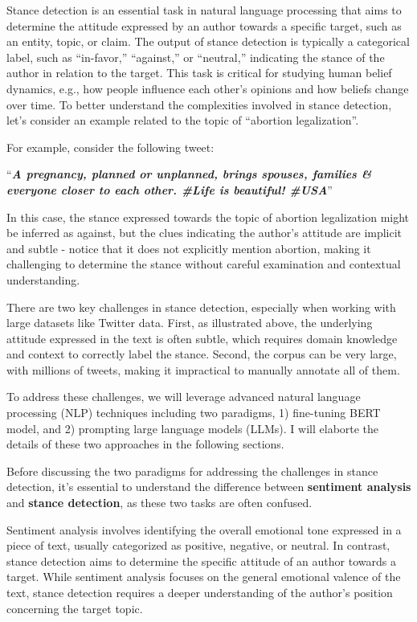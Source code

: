 \documentclass[11pt]{article}
\begin{document}
    Stance detection is an essential task in natural language processing
that aims to determine the attitude expressed by an author towards a
specific target, such as an entity, topic, or claim. The output of
stance detection is typically a categorical label, such as ``in-favor,''
``against,'' or ``neutral,'' indicating the stance of the author in
relation to the target. This task is critical for studying human belief
dynamics, e.g., how people influence each other's opinions and how
beliefs change over time. To better understand the complexities involved
in stance detection, let's consider an example related to the topic of
``abortion legalization''.

    For example, consider the following tweet:

``\textbf{\emph{A pregnancy, planned or unplanned, brings spouses,
families \& everyone closer to each other. \#Life is beautiful!
\#USA}}''

In this case, the stance expressed towards the topic of abortion
legalization might be inferred as against, but the clues indicating the
author's attitude are implicit and subtle - notice that it does not
explicitly mention abortion, making it challenging to determine the
stance without careful examination and contextual understanding.

    There are two key challenges in stance detection, especially when
working with large datasets like Twitter data. First, as illustrated
above, the underlying attitude expressed in the text is often subtle,
which requires domain knowledge and context to correctly label the
stance. Second, the corpus can be very large, with millions of tweets,
making it impractical to manually annotate all of them.

To address these challenges, we will leverage advanced natural language
processing (NLP) techniques including two paradigms, 1) fine-tuning BERT
model, and 2) prompting large language models (LLMs). I will elaborte
the details of these two approaches in the following sections.

    Before discussing the two paradigms for addressing the challenges in
stance detection, it's essential to understand the difference between
\textbf{sentiment analysis} and \textbf{stance detection}, as these two
tasks are often confused.

Sentiment analysis involves identifying the overall emotional tone
expressed in a piece of text, usually categorized as positive, negative,
or neutral. In contrast, stance detection aims to determine the specific
attitude of an author towards a target. While sentiment analysis focuses
on the general emotional valence of the text, stance detection requires
a deeper understanding of the author's position concerning the target
topic.
\end{document}
